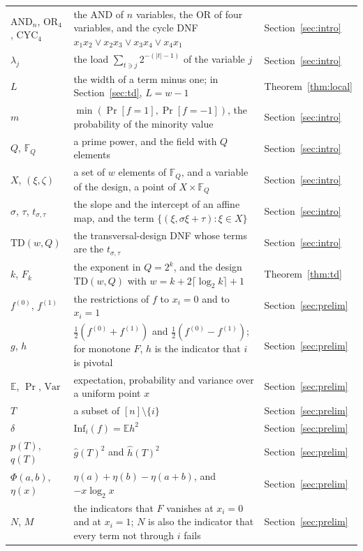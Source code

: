 \documentclass[11pt]{amsart}
\theoremstyle{remark}
\newcommand{\Inf}{\mathrm{Inf}}
\newcommand{\Var}{\mathrm{Var}}
\newcommand{\E}{\mathbb{E}}
\begin{document}
\begin{longtable}{@{}>{\raggedright\arraybackslash}p{}>{\raggedright\arraybackslash}p{}>{\raggedright\arraybackslash}p{}@{}}
$\mathrm{AND}_n$, $\mathrm{OR}_4$, $\mathrm{CYC}_4$ & the AND of $n$ variables, the OR of four variables, and the cycle DNF $x_1x_2\vee x_2x_3\vee x_3x_4\vee x_4x_1$ & Section~\ref{sec:intro} \\
$\lambda_j$ & the load $\sum_{t\ni j}2^{-(|t|-1)}$ of the variable $j$ & Section~\ref{sec:intro} \\
$L$ & the width of a term minus one; in Section~\ref{sec:td}, $L=w-1$ & Theorem~\ref{thm:local} \\
$m$ & $\min(\Pr[f=1],\Pr[f=-1])$, the probability of the minority value & Section~\ref{sec:intro} \\
$Q$, $\mathbb F_Q$ & a prime power, and the field with $Q$ elements & Section~\ref{sec:intro} \\
$X$, $(\xi,\zeta)$ & a set of $w$ elements of $\mathbb F_Q$, and a variable of the design, a point of $X\times\mathbb F_Q$ & Section~\ref{sec:intro} \\
$\sigma$, $\tau$, $t_{\sigma,\tau}$ & the slope and the intercept of an affine map, and the term $\{(\xi,\sigma\xi+\tau):\xi\in X\}$ & Section~\ref{sec:intro} \\
$\mathrm{TD}(w,Q)$ & the transversal-design DNF whose terms are the $t_{\sigma,\tau}$ & Section~\ref{sec:intro} \\
$k$, $F_k$ & the exponent in $Q=2^k$, and the design $\mathrm{TD}(w,Q)$ with $w=k+2\lceil\log_2k\rceil+1$ & Theorem~\ref{thm:td} \\
$f^{(0)}$, $f^{(1)}$ & the restrictions of $f$ to $x_i=0$ and to $x_i=1$ & Section~\ref{sec:prelim} \\
$g$, $h$ & $\tfrac12(f^{(0)}+f^{(1)})$ and $\tfrac12(f^{(0)}-f^{(1)})$; for monotone $F$, $h$ is the indicator that $i$ is pivotal & Section~\ref{sec:prelim} \\
$\E$, $\Pr$, $\Var$ & expectation, probability and variance over a uniform point $x$ & Section~\ref{sec:prelim} \\
$T$ & a subset of $[n]\setminus\{i\}$ & Section~\ref{sec:prelim} \\
$\delta$ & $\Inf_i(f)=\E h^2$ & Section~\ref{sec:prelim} \\
$p(T)$, $q(T)$ & $\hat g(T)^2$ and $\hat h(T)^2$ & Section~\ref{sec:prelim} \\
$\Phi(a,b)$, $\eta(x)$ & $\eta(a)+\eta(b)-\eta(a+b)$, and $-x\log_2x$ & Section~\ref{sec:prelim} \\
$N$, $M$ & the indicators that $F$ vanishes at $x_i=0$ and at $x_i=1$; $N$ is also the indicator that every term not through $i$ fails & Section~\ref{sec:prelim} \\

\end{longtable}
\end{document}
